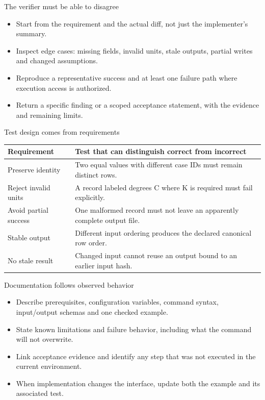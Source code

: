\documentclass[aspectratio=169,11pt]{beamer}
\begin{document}
\begin{frame}[t,fragile]{The verifier must be able to disagree}
\fontsize{11.5}{14}\selectfont
\begin{itemize}\setlength{\itemsep}{2mm}
\item Start from the requirement and the actual diff, not just the implementer's summary.
\item Inspect edge cases: missing fields, invalid units, stale outputs, partial writes and changed assumptions.
\item Reproduce a representative success and at least one failure path where execution access is authorized.
\item Return a specific finding or a scoped acceptance statement, with the evidence and remaining limits.
\end{itemize}
\end{frame}
\begin{frame}[t,fragile]{Test design comes from requirements}
\fontsize{10.5}{12.5}\selectfont\setlength{\tabcolsep}{4pt}\renewcommand{\arraystretch}{1.15}
\begin{tabular}{>{\raggedright\arraybackslash}p{}>{\raggedright\arraybackslash}p{}}
\toprule
\textbf{Requirement} & \textbf{Test that can distinguish correct from incorrect} \\ \midrule
Preserve identity & Two equal values with different case IDs must remain distinct rows. \\[2pt]
Reject invalid units & A record labeled degrees C where K is required must fail explicitly. \\[2pt]
Avoid partial success & One malformed record must not leave an apparently complete output file. \\[2pt]
Stable output & Different input ordering produces the declared canonical row order. \\[2pt]
No stale result & Changed input cannot reuse an output bound to an earlier input hash. \\[2pt]
\bottomrule\end{tabular}\par\vspace{2mm}
\end{frame}
\begin{frame}[t,fragile]{Documentation follows observed behavior}
\fontsize{11.5}{14}\selectfont
\begin{itemize}\setlength{\itemsep}{2mm}
\item Describe prerequisites, configuration variables, command syntax, input/output schemas and one checked example.
\item State known limitations and failure behavior, including what the command will not overwrite.
\item Link acceptance evidence and identify any step that was not executed in the current environment.
\item When implementation changes the interface, update both the example and its associated test.
\end{itemize}
\end{frame}
\end{document}
